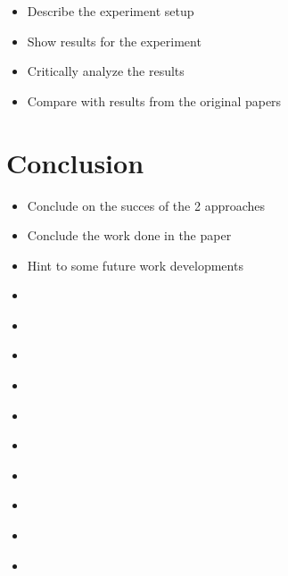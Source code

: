 \documentclass[runningheads,a4paper]{llncs}
\begin{document}
\begin{itemize}
	\item Describe the experiment setup
	\item Show results for the experiment
	\item Critically analyze the results
	\item Compare with results from the original papers
\end{itemize}


\section{Conclusion}

\begin{itemize}
	\item Conclude on the succes of the 2 approaches
	\item Conclude the work done in the paper
	\item Hint to some future work developments
\end{itemize}



\begin{itemize}
	\item \cite{Hoffmann01theff}
	\item \cite{FFReplan}
	\item \cite{teichteil2010incremental}
	\item \cite{yoon2008probabilistic}
	\item \cite{teichteil2012fast}
	\item \cite{bonet2011planning}
	\item \cite{taig2013translation}
	\item \cite{martin2013progressive}
	\item \cite{taig2013conformant}
	\item \cite{2013workshop}
\end{itemize}




\end{document}
